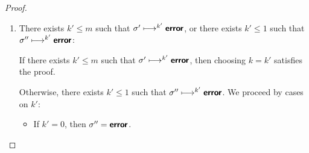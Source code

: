 \begin{proof}
\begin{enumerate}
\begin{itemize}
        
      \item If $j' = 1$:
        
        From $\conf'' \ctxstepsto \conf'''$ and $\conf''
        \ctxstepsto^{j'} \conf_c'$ and
        Lemma~\ref{lem:strong-local-quasi-confluence}, one of the
        following two cases is true:
        \begin{enumerate}
        \item There exist $\conf_c''$ and $i''$ and $j''$ such that
          $\conf'_c \ctxstepsto^{i''} \conf_c''$ and $\conf'''
          \ctxstepsto^{j''} \conf_c''$ and $i'' \leq 1$ and $j''
          \leq 1$.  So we also have $\conf' \ctxstepsto^{i'}
          \conf_c' \ctxstepsto^{i''} \conf_c''$.  In summary, we
          pick $\conf_c = \conf_c''$ and $i = i' + i''$ and $j =
          j''$, which is sufficient because $i = i' + i'' \leq m +
          1$ and $j = j'' \leq 1$.
        \item $\conf''' \ctxstepsto \error$ or $\conf'_c \ctxstepsto
          \error$.

          If $\conf''' \ctxstepsto \error$, then choosing $k = 1$
          satisfies the proof.

          Otherwise, $\conf'_c \ctxstepsto \error$, therefore $\conf'
          \ctxstepsto^{i'} \conf'_c \ctxstepsto \error$.

          Hence $\conf' \ctxstepsto^{i'+1} \error$.

          Since $i' \leq m$, we have that $i' + 1 \leq m + 1$, and
          so choosing $k = i' + 1$ satisfies the proof.
            
        \end{enumerate}

      \end{itemize}

    \item There exists $k' \leq m$ such that $\sigma' \longmapsto^{k'}
      \textbf{\textsf{error}}$, or there exists $k' \leq 1$ such that $\sigma''
      \longmapsto^{k'} \textbf{\textsf{error}}$:

      If there exists $k' \leq m$ such that $\sigma' \longmapsto^{k'}
      \textbf{\textsf{error}}$, then choosing $k = k'$ satisfies the proof.

      Otherwise, there exists $k' \leq 1$ such that $\sigma''
      \longmapsto^{k'} \textbf{\textsf{error}}$.  We proceed by cases on $k'$:

      \begin{itemize}

      \item If $k' = 0$, then $\sigma'' = \textbf{\textsf{error}}$.


\end{itemize}
\end{enumerate}
\end{proof}
